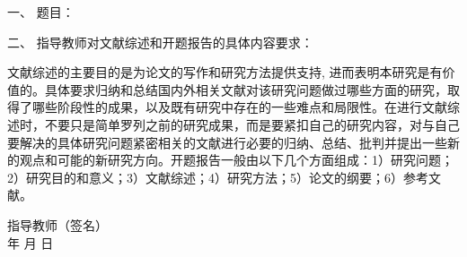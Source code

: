 \newpage

\thispagestyle{empty}

{
\setlength{\parindent}{0em}
\renewcommand{\baselinestretch}{2}
{\songti\sihao\bfseries

一、 \; 题目： \; \underline{\makebox[24em]{\zjutitlec}}

\vspace{2em}

二、 \; 指导教师对文献综述和开题报告的具体内容要求： \\ \par
}
{
  \songti\xiaosi 


文献综述的主要目的是为论文的写作和研究方法提供支持, 进而表明本研究是有价值的。具体要求归纳和总结国内外相关文献对该研究问题做过哪些方面的研究，取得了哪些阶段性的成果，以及既有研究中存在的一些难点和局限性。在进行文献综述时，不要只是简单罗列之前的研究成果，而是要紧扣自己的研究内容，对与自己要解决的具体研究问题紧密相关的文献进行必要的归纳、总结、批判并提出一些新的观点和可能的新研究方向。开题报告一般由以下几个方面组成：1）研究问题；2）研究目的和意义；3）文献综述；4）研究方法；5）论文的纲要；6）参考文献。
}

\vspace{9cm}
}

{
\songti\xiaosi\bfseries
\begin{flushright}
  指导教师（签名） \; \underline{\hspace{6em}} \\
  年 \qquad 月 \qquad 日
\end{flushright}
}

